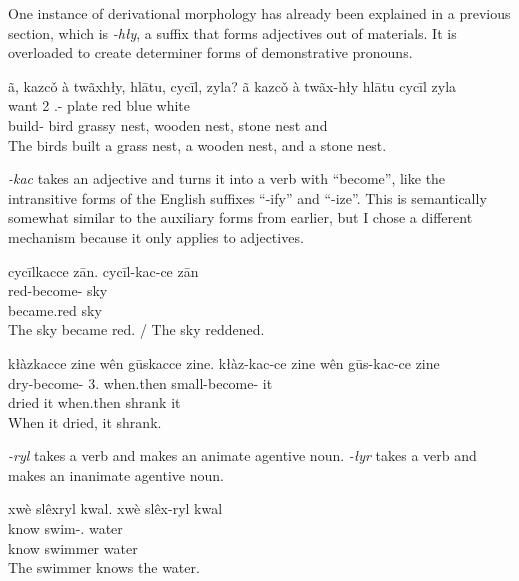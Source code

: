 One instance of derivational morphology
has already been explained in a previous section,
which is \textit{-hły},
a suffix that forms adjectives out of materials.
It is overloaded to create determiner forms
of demonstrative pronouns.

\begin{exe}
    \ex
    ã, kazcǒ à twãxhły, hlātu, cycīl, zyla?
    \glll
    ã kazcǒ à twãx-hły hlātu cycīl zyla  \\
    \Q{} want 2\Sg{} \Int{}.\Inanim{}-\Adj{} plate red blue white \\
    build-\Hst{} bird grassy nest, wooden nest, stone nest and \\
    \glt
    The birds built a grass nest, a wooden nest, and a stone nest.
\end{exe}

\textit{-kac} takes an adjective and turns it into a verb
with ``become'', like the intransitive forms of
the English suffixes ``-ify'' and ``-ize''.
This is semantically somewhat similar to the auxiliary forms from earlier,
but I chose a different mechanism because it only applies to adjectives.

\begin{exe}
    \ex
    cycīlkacce zān.
    \glll
    cycīl-kac-ce zān \\
    red-become-\Pst{} sky \\
    became.red sky \\
    \glt
    The sky became red.
    /
    The sky reddened.
\end{exe}

\begin{exe}
    \ex
    kłàzkacce zine wên gūskacce zine.
    \glll
    kłàz-kac-ce zine wên gūs-kac-ce zine \\
    dry-become-\Pst{} 3\Sg{}.\Inanim{} when.then small-become-\Pst{} it \\
    dried it when.then shrank it \\
    \glt
    When it dried, it shrank.
\end{exe}

\textit{-ryl} takes a verb and makes an animate agentive noun.
\textit{-łyr} takes a verb and makes an inanimate agentive noun.

\begin{exe}
    \ex
    xwè slêxryl kwal.
    \glll
    xwè slêx-ryl kwal \\
    know swim-\Agt{}.\Anim{} water \\
    know swimmer water \\
    \glt
    The swimmer knows the water.
\end{exe}


